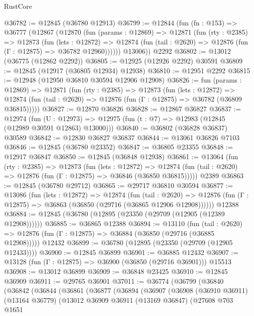 \begin{lexlean}{RustCore}
\begin{coremodule}
@36782 := @12845 (@36780 @12913)
@36799 := @12844
    (fun (fn : @153) =>
    @36777
      (@12867
        (@12870
          (fun (params : @12869) =>
          @12871
            (fun (rty : @2385) =>
            @12873
              (fun (lets : @12872) =>
              @12874 (fun (tail : @2620) => @12876 (fun (Γ : @12875) => @36782 @12960))))))
        @13006))
    @2292
@36802 := @13012 (@36775 (@12862 @2292))
@36805 := @12925 (@12926 @2292) @30591
@36809 := @12845 (@12917 (@36805 @12934) @12938)
@36810 := @12951 @2292
@36815 := @12948 (@12950 @36810 @30594 @12906 @12908)
@36826 := fun (params : @12869) =>
  @12871
    (fun (rty : @2385) =>
    @12873
      (fun (lets : @12872) =>
      @12874 (fun (tail : @2620) => @12876 (fun (Γ : @12875) => @36782 (@36809 @36815)))))
@36827 := @12870 @36826
@36828 := @12867 @36827
@36837 := @12974
    (fun (U : @12973) => @12975 (fun (t : @7) => @12983 (@12845 (@12989 @30591 @12863) @13000)))
@36840 := @36802 (@36828 @36837) @30589
@36842 := @12830 @36827 @36837
@36844 := @13061 @36826 @7103
@36846 := @12845 (@36780 @23352)
@36847 := @36805 @23355
@36848 := @12917 @36847
@36850 := @12845 (@36848 @12938)
@36861 := @13064
    (fun (rty : @2385) =>
    @12873
      (fun (lets : @12872) =>
      @12874 (fun (tail : @2620) => @12876 (fun (Γ : @12875) => @36846 (@36850 @36815)))))
    @2389
@36863 := @12845 (@36780 @29712)
@36865 := @29717 @36810 @30594
@36877 := @13086
    (fun (lets : @12872) =>
    @12874
      (fun (tail : @2620) =>
      @12876 (fun (Γ : @12875) => @36863 (@36850 (@29716 (@36865 @12906 @12908))))))
    @12388
@36884 := @12845 (@36780 (@12895 (@23350 (@29709 (@12905 (@12389 @12908))))))
@36885 := @36865 @12388
@36894 := @13110
    (fun (tail : @2620) => @12876 (fun (Γ : @12875) => @36884 (@36850 (@29716 (@36885 @12908)))))
    @12432
@36899 := @36780 (@12895 (@23350 (@29709 (@12905 @12433))))
@36900 := @12845 @36899
@36901 := @36885 @12432
@36907 := @13128 (fun (Γ : @12875) => @36900 (@36850 (@29716 @36901))) @15513
@36908 := @13012 @36899
@36909 := @36848 @23425
@36910 := @12845 @36909
@36911 := @29765 @36901
@37011 := @36774
    (@36799
      (@36840
        (@36842
          (@36844
            (@36861
              (@36877
                (@36894
                  (@36907
                    (@36908
                      (@36910 @36911)
                      (@13164 @36779)
                      (@13012
                        @36909
                        @36911
                        (@13169 @36847)
                        (@27608
                          @703
                          @1651

\end{coremodule}
\end{lexlean}
